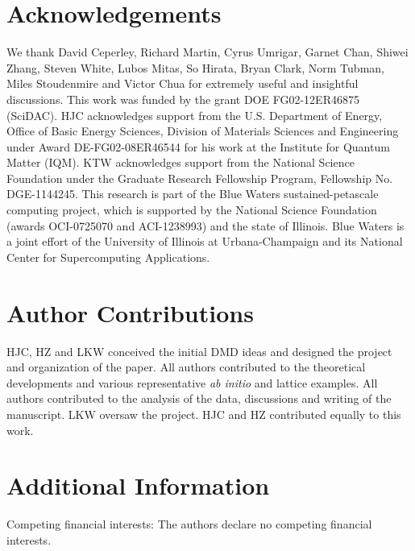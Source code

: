 \section{Acknowledgements} 
We thank  David Ceperley,  Richard Martin, Cyrus Umrigar,  Garnet Chan,  Shiwei Zhang, Steven White,  
Lubos Mitas, So Hirata, Bryan Clark, Norm Tubman, Miles Stoudenmire and Victor Chua for extremely useful and insightful discussions. 
This work was funded by the grant DOE FG02-12ER46875 (SciDAC). HJC acknowledges support from the U.S. Department of Energy, 
Office of Basic Energy Sciences, Division of Materials Sciences and Engineering under Award DE-FG02-08ER46544 for his work at the Institute for Quantum Matter (IQM). 
KTW acknowledges support from the National Science Foundation under the Graduate Research Fellowship Program, Fellowship No. DGE-1144245.
This research is part of the Blue Waters sustained-petascale computing project, which is supported by the National Science Foundation (awards OCI-0725070 and ACI-1238993) and the state of Illinois. Blue Waters is a joint effort of the University of Illinois at Urbana-Champaign and its National Center for Supercomputing Applications.

\section*{Author Contributions}
HJC, HZ and LKW conceived the initial DMD ideas and designed the project and organization of the paper. 
All authors contributed to the theoretical developments and various representative \textit{ab initio} and lattice examples. 
All authors contributed to the analysis of the data, discussions and writing of the manuscript. 
LKW oversaw the project. HJC and HZ contributed equally to this work.
 
\section*{Additional Information}
Competing financial interests: The authors declare no competing financial interests.
